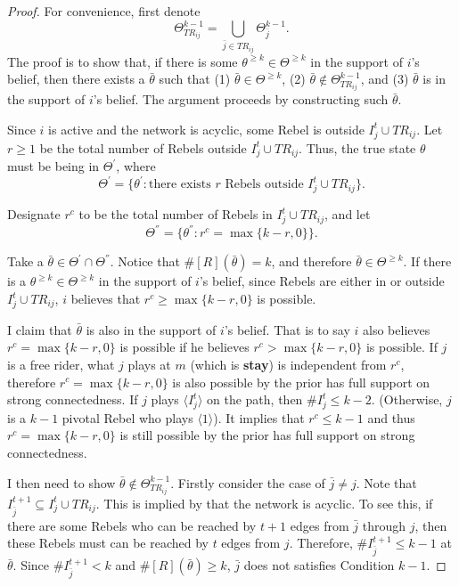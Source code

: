 \documentclass[12pt,letter]{article}
\theoremstyle{definition}
\theoremstyle{remark}
\theoremstyle{claim}
\begin{document}
\begin{proof}
For convenience, first denote
\[\Theta^{k-1}_{TR_{ij}}=\bigcup_{\bar{j}\in TR_{ij}}\Theta^{k-1}_{\bar{j}}.\]
The proof is to show that, if there is some $\theta^{\geq k}\in\Theta^{\geq k}$ in the support of $i$'s belief, then there exists a $\bar{\theta}$ such that (1) $\bar{\theta}\in\Theta^{\geq k}$, (2) $\bar{\theta}\not\in \Theta^{k-1}_{TR_{ij}}$, and (3) $\bar{\theta}$ is in the support of $i$'s belief. The argument proceeds by constructing such $\bar{\theta}$. 

Since $i$ is active and the network is acyclic, some Rebel is outside $I^t_j\cup TR_{ij}$. Let $r\geq 1$ be the total number of Rebels outside $I^t_j\cup TR_{ij}$. Thus, the true state $\theta$ must be being in ${\Theta}^{'}$, where
\[{\Theta}^{'}=\{{\theta}^{'}:\text{there exists $r$ Rebels outside $I^t_j\cup TR_{ij}$}\}.\]

Designate $r^c$ to be the total number of Rebels in $I^t_j\cup TR_{ij}$, and let
\[{\Theta}^{''}=\{{\theta}^{''}:\text{$r^c=\max\{k-r,0\}$}\}.\]

Take a ${\bar{\theta}}\in\Theta^{'}\cap \Theta^{''}$. Notice that $\#[R]({\bar{\theta}})= k$, and therefore ${\bar{\theta}}\in \Theta^{\geq k}$. If there is a $\theta^{\geq k}\in\Theta^{\geq k}$ in the support of $i$'s belief, since Rebels are either in or outside $I^t_j\cup TR_{ij}$, $i$ believes that $r^c\geq \max\{k-r, 0\}$ is possible. 

I claim that ${\bar{\theta}}$ is also in the support of $i$'s belief. That is to say $i$ also believes $r^c=\max\{k-r,0\}$ is possible if he believes $r^c>\max\{k-r,0\}$ is possible. If $j$ is a free rider, what $j$ plays at $m$ (which is \textbf{stay}) is independent from $r^c$, therefore $r^c=\max\{k-r,0\}$ is also possible by the prior has full support on strong connectedness. If $j$ plays $\langle I^t_j \rangle$ on the path, then $\#I^t_j\leq k-2$. (Otherwise, $j$ is a $k-1$ pivotal Rebel who plays $\langle 1 \rangle$). It implies that $r^c\leq k-1$ and thus $r^c=\max\{k-r,0\}$ is still possible by the prior has full support on strong connectedness.

I then need to show $\bar{\theta}\not\in \Theta^{k-1}_{TR_{ij}}$. Firstly consider the case of $\bar{j}\neq j$. Note that $I^{t+1}_{\bar{j}}\subseteq I^t_j\cup TR_{ij}$. This is implied by that the network is acyclic. To see this, if there are some Rebels who can be reached by $t+1$ edges from $\bar{j}$ through $j$, then these Rebels must can be reached by $t$ edges from $j$. Therefore, $\#I^{t+1}_{\bar{j}}\leq k-1$ at $\bar{\theta}$. Since $\#I^{t+1}_{\bar{j}}<k$ and $\#[R](\bar{\theta})\geq k$, $\bar{j}$ does not satisfies Condition $k-1$.


\end{proof}
\end{document}
